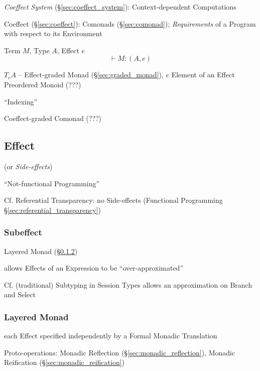 \emph{Coeffect System} (\S\ref{sec:coeffect_system}):
Context-dependent Computations

Coeffect (\S\ref{sec:coeffect}): Comonads (\S\ref{sec:comonad});
\emph{Requirements} of a Program with respect to its Environment

Term $M$, Type $A$, Effect $e$
\[
  \vdash M :(A,e)
\]

$T_e A$ -- Effect-graded Monad (\S\ref{sec:graded_monad}), $e$ Element
of an Effect Preordered Monoid (???)

``Indexing''

Coeffect-graded Comonad (???)



\subsection{Effect}\label{sec:effect}

(or \emph{Side-effects})

``Not-functional Programming''

\fist Cf. Referential Transparency: no Side-effects (Functional
Programming \S\ref{sec:referential_transparency})



\subsubsection{Subeffect}\label{sec:subeffect}

Layered Monad (\S\ref{sec:layered_monad}) \cite{filinski99}

allows Effects of an Expression to be ``over-approximated''
\cite{orchard-yoshida16}

\fist Cf. (traditional) Subtyping in Session Types allows an
approximation on Branch and Select \cite{orchard-yoshida16}



\subsubsection{Layered Monad}\label{sec:layered_monad}
\cite{filinski99}

each Effect specified independently by a Formal Monadic Translation

Proto-operations: Monadic Reflection (\S\ref{sec:monadic_reflection}),
Monadic Reification (\S\ref{sec:monadic_reification})

